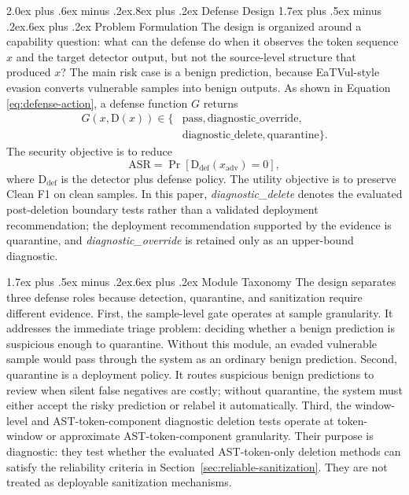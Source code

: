 \documentclass[letterpaper,twocolumn,10pt,twoside]{article}
\makeatletter
\renewcommand\section{\@startsection{section}{1}{\z@}%
  {2.0ex plus .6ex minus .2ex}{.8ex plus .2ex}%
  {\normalfont\large\bfseries}}
\renewcommand\subsection{\@startsection{subsection}{2}{\z@}%
  {1.7ex plus .5ex minus .2ex}{.6ex plus .2ex}%
  {\normalfont\normalsize\bfseries}}
\newcommand{\gate}{sample-level gate}
\newcommand{\cleanf}{Clean F1}
\makeatother
\begin{document}
\section{Defense Design}
\subsection{Problem Formulation}
The design is organized around a capability question: what can the defense do when it observes the token sequence $x$ and the target detector output, but not the source-level structure that produced $x$? The main risk case is a benign prediction, because EaTVul-style evasion converts vulnerable samples into benign outputs. As shown in Equation \eqref{eq:defense-action}, a defense function $G$ returns
\begin{equation}
  \begin{aligned}
  G(x, \mathrm{D}(x)) \in \{&\text{pass}, \text{diagnostic\_override},\\
  &\text{diagnostic\_delete}, \text{quarantine}\}.
  \end{aligned}
  \label{eq:defense-action}
\end{equation}
The security objective is to reduce
\begin{equation}
  \mathrm{ASR} = \Pr[\mathrm{D}_{\mathrm{def}}(x_{\mathrm{adv}}) = 0],
  \label{eq:asr}
\end{equation}
where $\mathrm{D}_{\mathrm{def}}$ is the detector plus defense policy. The utility objective is to preserve \cleanf{} on clean samples.
In this paper, \textit{diagnostic\_delete} denotes the evaluated post-deletion boundary tests rather than a validated deployment recommendation; the deployment recommendation supported by the evidence is quarantine, and \textit{diagnostic\_override} is retained only as an upper-bound diagnostic.

\subsection{Module Taxonomy}
The design separates three defense roles because detection, quarantine, and sanitization require different evidence. First, the \gate{} operates at sample granularity. It addresses the immediate triage problem: deciding whether a benign prediction is suspicious enough to quarantine. Without this module, an evaded vulnerable sample would pass through the system as an ordinary benign prediction. Second, quarantine is a deployment policy. It routes suspicious benign predictions to review when silent false negatives are costly; without quarantine, the system must either accept the risky prediction or relabel it automatically. Third, the window-level and AST-token-component diagnostic deletion tests operate at token-window or approximate AST-token-component granularity. Their purpose is diagnostic: they test whether the evaluated AST-token-only deletion methods can satisfy the reliability criteria in Section~\ref{sec:reliable-sanitization}. They are not treated as deployable sanitization mechanisms.
\end{document}
